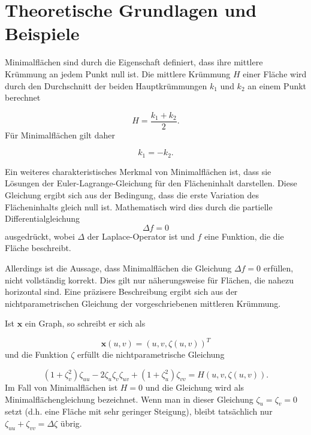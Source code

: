 %
%
%
%
\section{Theoretische Grundlagen und Beispiele
	\label{minimalflaechen:section:Theoretische Grundlagen und Beispiele}}
Minimalflächen sind durch die Eigenschaft definiert, dass ihre mittlere Krümmung an jedem Punkt null ist.
Die mittlere Krümmung $H$ einer Fläche wird durch den Durchschnitt der beiden Hauptkrümmungen $k_1$ und $k_2$ an einem Punkt berechnet

\begin{equation}
	H=\frac{k_{1}+k_{2}}{2}.
\end{equation}
%
Für Minimalflächen gilt daher

\begin{equation}
	k_{1}=-k_{2}.
\end{equation}

Ein weiteres charakteristisches Merkmal von Minimalflächen ist, dass sie Lösungen der Euler-Lagrange-Gleichung für den Flächeninhalt darstellen.
Diese Gleichung ergibt sich aus der Bedingung, dass die erste Variation des Flächeninhalts gleich null ist.
Mathematisch wird dies durch die partielle Differentialgleichung
%
\begin{equation}
	\Delta f = 0
\end{equation}
%
ausgedrückt, wobei $\Delta$ der Laplace-Operator ist und $f$ eine Funktion, die die Fläche beschreibt.

Allerdings ist die Aussage, dass Minimalflächen die Gleichung \(\Delta f = 0\) erfüllen, nicht vollständig korrekt.
Dies gilt nur näherungsweise für Flächen, die nahezu horizontal sind.
Eine präzisere Beschreibung ergibt sich aus der nichtparametrischen Gleichung der vorgeschriebenen mittleren Krümmung.

Ist \(\mathbf{x}\) ein Graph, so schreibt er sich als

\begin{equation}
\mathbf{x}(u,v) = (u,v,\zeta(u,v))^{T}
\end{equation}
%
und die Funktion \(\zeta\) erfüllt die nichtparametrische Gleichung

\begin{equation}
(1 + \zeta_{v}^{2})\zeta_{uu} - 2\zeta_{u}\zeta_{v}\zeta_{uv} + (1 + \zeta_{u}^{2})\zeta_{vv} = H(u,v,\zeta(u,v)).
\end{equation}
%
Im Fall von Minimalflächen ist \(H = 0\) und die Gleichung wird als Minimalflächengleichung bezeichnet.
Wenn man in dieser Gleichung \(\zeta_u = \zeta_v = 0\) setzt (d.h. eine Fläche mit sehr geringer Steigung), bleibt tatsächlich nur \(\zeta_{uu} + \zeta_{vv} = \Delta \zeta\) übrig. 







